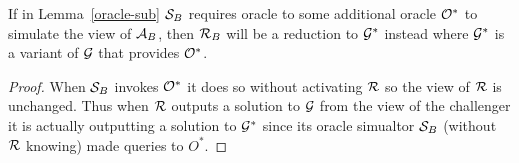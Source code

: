 \begin{corollary}
  If in Lemma~\ref{oracle-sub} $\mathcal{S}_B$ requires oracle to some additional oracle $\mathcal{O}^*$ to simulate the view of $\mathcal{A}_B$, then $\mathcal{R}_B$ will be a reduction to $\mathcal{G}^*$ instead where $\mathcal{G}^*$ is a variant of $\mathcal{G}$ that provides $\mathcal{O}^*$.
\end{corollary}
\begin{proof}
  When $\mathcal{S}_B$ invokes $\mathcal{O}^*$ it does so without activating $\mathcal{R}$ so the view of $\mathcal{R}$ is unchanged.
  Thus when $\mathcal{R}$ outputs a solution to $\mathcal{G}$ from the view of the challenger it is actually outputting a solution to $\mathcal{G}^*$ since its oracle simualtor $\mathcal{S}_B$ (without $\mathcal{R}$ knowing) made queries to $O^*$.
\end{proof}
